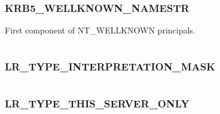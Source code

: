 \documentclass[letterpaper,10pt,english]{sphinxmanual}
\begin{document}
\subsubsection{KRB5\_WELLKNOWN\_NAMESTR}
\label{appdev/refs/macros/KRB5_WELLKNOWN_NAMESTR::doc}\label{appdev/refs/macros/KRB5_WELLKNOWN_NAMESTR:krb5-wellknown-namestr}\label{appdev/refs/macros/KRB5_WELLKNOWN_NAMESTR:krb5-wellknown-namestr-data}

\begin{fulllineitems}
\label{appdev/refs/macros/KRB5_WELLKNOWN_NAMESTR:KRB5_WELLKNOWN_NAMESTR}
\end{fulllineitems}


First component of NT\_WELLKNOWN principals.

\begin{tabulary}{\linewidth}{|L|L|}
\hline

 & 
\\\hline
\end{tabulary}



\subsubsection{LR\_TYPE\_INTERPRETATION\_MASK}
\label{appdev/refs/macros/LR_TYPE_INTERPRETATION_MASK:lr-type-interpretation-mask-data}\label{appdev/refs/macros/LR_TYPE_INTERPRETATION_MASK:lr-type-interpretation-mask}\label{appdev/refs/macros/LR_TYPE_INTERPRETATION_MASK::doc}

\begin{fulllineitems}
\label{appdev/refs/macros/LR_TYPE_INTERPRETATION_MASK:LR_TYPE_INTERPRETATION_MASK}
\end{fulllineitems}


\begin{tabulary}{\linewidth}{|L|L|}
\hline

 & 
\\\hline
\end{tabulary}



\subsubsection{LR\_TYPE\_THIS\_SERVER\_ONLY}
\label{appdev/refs/macros/LR_TYPE_THIS_SERVER_ONLY:lr-type-this-server-only-data}\label{appdev/refs/macros/LR_TYPE_THIS_SERVER_ONLY:lr-type-this-server-only}\label{appdev/refs/macros/LR_TYPE_THIS_SERVER_ONLY::doc}
\end{document}
